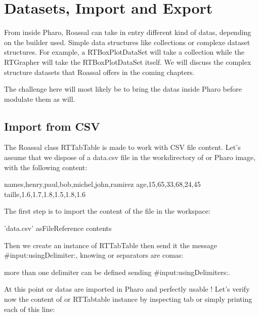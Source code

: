 \documentclass[a4paper,10pt,twoside]{book}
\begin{document}
\fi
\sloppy

\chapter{Datasets, Import and Export}
From inside Pharo, Roassal can take in entry different kind of datas, depending on the builder used. Simple data structures like collections or complexe dataset structures. For example, a RTBoxPlotDataSet will take a collection while the RTGrapher will take the RTBoxPlotDataSet itself. We will discuss the complex structure datasets that Roassal offers in the coming chapters.

The challenge here will most likely be to bring the datas inside Pharo before modulate them as will.
\section{Import from CSV}
The Roassal class RTTabTable is made to work with CSV file content. Let's assume that we dispose of a data.csv file in the workdirectory of or Pharo image, with the following content:


\begin{code}{}
names,henry,paul,bob,michel,john,ramirez
age,15,65,33,68,24,45
taille,1.6,1.7,1.8,1.5,1.8,1.6
\end{code}


The first step is to import the content of the file in the workspace:     

\begin{code}{}
'data.csv' asFileReference contents
\end{code}


Then we create an instance of RTTabTable then send it the message \#input:usingDelimiter:, knowing or separators are comas:



\begin{note}

more than one delimiter can be defined sending \#input:usingDelimiters:.  
\end{note}

At this point or datas are imported in Pharo and perfectly usable ! Let's verify now the content of or RTTabtable instance by inspecting tab or simply printing each of this line:
\end{document}
